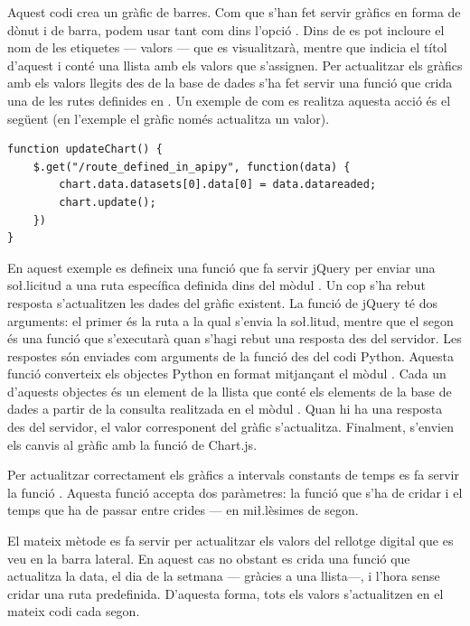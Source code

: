 \documentclass{tfgitic}[2022/06/30]
\begin{document}
Aquest codi crea un gràfic de barres. Com que s'han fet servir gràfics en forma de dònut i de barra, podem usar tant  com  dins l'opció . Dins de  es pot incloure el nom de les etiquetes --- valors --- que es visualitzarà, mentre que  indicia el títol d'aquest i  conté una llista amb els valors que s'assignen. Per actualitzar els gràfics amb els valors llegits des de la base de dades s'ha fet servir una funció que crida una de les rutes definides en . Un exemple de com es realitza aquesta acció és el següent (en l'exemple el gràfic només actualitza un valor).

\begin{lstlisting}[style = javascript]
function updateChart() {
    $.get("/route_defined_in_apipy", function(data) {
        chart.data.datasets[0].data[0] = data.datareaded;
        chart.update();
    })
}
\end{lstlisting}

En aquest exemple es defineix una funció  que fa servir jQuery per enviar una so\l.licitud  a una ruta específica definida dins del mòdul . Un cop s'ha rebut resposta s'actualitzen les dades del gràfic existent. La funció  de jQuery té dos arguments: el primer és la ruta a la qual s'envia la so\l.litud, mentre que el segon és una funció que s'executarà quan s'hagi rebut una resposta des del servidor. Les respostes són enviades com arguments de la funció  des del codi Python. Aquesta funció converteix els objectes Python en format  mitjançant el mòdul . Cada un d'aquests objectes és un element de la llista que conté els elements de la base de dades a partir de la consulta realitzada en el mòdul . Quan hi ha una resposta des del servidor, el valor corresponent del gràfic s'actualitza. Finalment, s'envien els canvis al gràfic amb la funció  de Chart.js.

Per actualitzar correctament els gràfics a intervals constants de temps es fa servir la funció . Aquesta funció accepta dos paràmetres: la funció que s'ha de cridar i el temps que ha de passar entre crides --- en mi\l.lèsimes de segon.

El mateix mètode es fa servir per actualitzar els valors del rellotge digital que es veu en la barra lateral. En aquest cas no obstant es crida una funció que actualitza la data, el dia de la setmana --- gràcies a una llista---, i l'hora sense cridar una ruta predefinida. D'aquesta forma, tots els valors s'actualitzen en el mateix codi cada segon.
\end{document}
